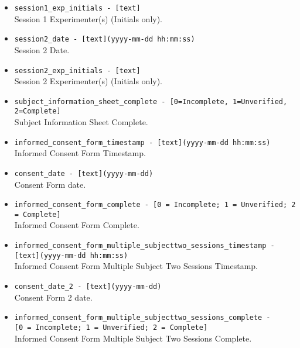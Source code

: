 \begin{description}
\begin{addmargin}[0em]{0em}
\begin{addmargin}[1em]{0em}
\begin{itemize}
            \item \verb|session1_exp_initials - [text]|\\Session 1 Experimenter(s) (Initials only).
            \item \verb|session2_date - [text](yyyy-mm-dd hh:mm:ss)|\\Session 2 Date.
            \item \verb|session2_exp_initials - [text]|\\Session 2 Experimenter(s) (Initials only).
            \item \verb|subject_information_sheet_complete - [0=Incomplete, 1=Unverified, 2=Complete]|\\Subject Information Sheet Complete.
            \item \verb|informed_consent_form_timestamp - [text](yyyy-mm-dd hh:mm:ss)|\\Informed Consent Form Timestamp.
            \item \verb|consent_date - [text](yyyy-mm-dd)|\\Consent Form date.
            \item \verb|informed_consent_form_complete - [0 = Incomplete; 1 = Unverified; 2 = Complete]|\\Informed Consent Form Complete.
            \item \verb|informed_consent_form_multiple_subjecttwo_sessions_timestamp -|\\\verb|[text](yyyy-mm-dd hh:mm:ss)|\\Informed Consent Form Multiple Subject Two Sessions Timestamp.
            \item \verb|consent_date_2 - [text](yyyy-mm-dd)|\\Consent Form 2 date.
            \item \verb|informed_consent_form_multiple_subjecttwo_sessions_complete -|\\\verb|[0 = Incomplete; 1 = Unverified; 2 = Complete]|\\Informed Consent Form Multiple Subject Two Sessions Complete.\\


\end{itemize}
\end{addmargin}
\end{addmargin}
\end{description}
